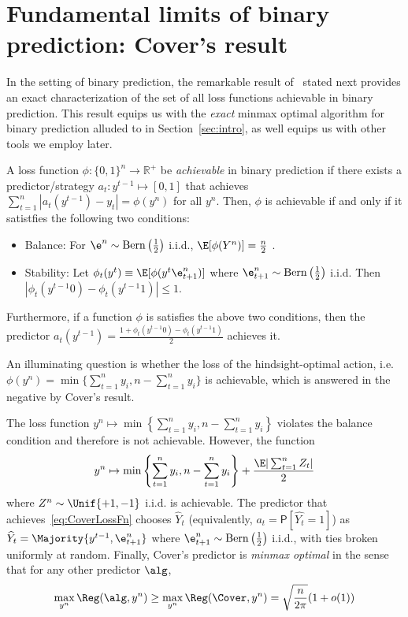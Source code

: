\section{Fundamental limits of binary prediction: Cover's result} \label{appendix:Cover}

In the setting of binary prediction, the remarkable result of~\cite{Cover1966} stated next provides an exact characterization of the set of all loss functions achievable in binary prediction. This result equips us with the \emph{exact} minmax optimal algorithm for binary prediction alluded to in Section~\ref{sec:intro}, as well equips us with other tools we employ later. 
\begin{theorem}  \label{thm:CoverAchievableFn}
A loss function $\phi : \{0,1\}^n \to \mathbb{R}^+$ be \emph{achievable} in binary prediction if there exists a predictor/strategy $a_t: y^{t-1} \mapsto [0,1]$ that achieves $\sum_{t=1}^n |a_t(y^{t-1})-y_t| = \phi(y^n)$ 
for all $y^n$. Then, $\phi$ is achievable if and only if it satistfies the following two conditions:
\begin{itemize}
    \item Balance: For $\e^n \sim \mathrm{Bern}\left(\frac{1}{2}\right)$ i.i.d.,  $\E[\phi(Y^n)] = \frac{n}{2}$ . 
    \item Stability: Let $\phi_t(y^t) \equiv \E[\phi(y^{t}\e_{t+1}^n)]$ where $\e_{t+1}^n \sim \mathrm{Bern}\left(\frac{1}{2}\right)$ i.i.d. Then $|\phi_t(y^{t-1}0)-\phi_t(y^{t-1}1)| \le 1$. 
    \end{itemize}
    Furthermore, if a function $\phi$ is satisfies the above two conditions, then the predictor $a_t(y^{t-1}) = \frac{1+\phi_t(y^{t-1}0)-\phi_t(y^{t-1}1)}{2}$ achieves it.
\end{theorem}

An illuminating question is whether the loss of the hindsight-optimal action, i.e. $\phi(y^n) = \min\{\sum_{t=1}^n y_i, n-\sum_{t=1}^n y_i\}$ is achievable, which is answered in the negative by Cover's result. 

\begin{corollary} \label{cor:BinPredOptReg}
    The loss function $y^n \mapsto \min\left\{\sum_{t=1}^n y_i, n-\sum_{t=1}^n y_i\right\}$ violates the balance condition and therefore is not achievable. However, the function 
    \begin{align}
    \label{eq:CoverLossFn}
    y^n \mapsto \min\left\{\sum_{t=1}^n y_i, n-\sum_{t=1}^n y_i\right\} + \frac{\E|\sum_{t=1}^n Z_t|}{2}
    \end{align}
    where $Z^n \sim \Unif\{+1,-1\}$ i.i.d. is achievable. The predictor that achieves~\cref{eq:CoverLossFn} chooses $\widehat{Y}_t$ (equivalently, $a_t = \mathsf{P}[\widehat{Y_t} = 1]$) as
        $\widehat{Y}_t = \Majority\{y^{t-1},\e_{t+1}^n\}$
    where $\e_{t+1}^n \sim \mathrm{Bern}\left(\frac{1}{2}\right)$ i.i.d., with ties broken uniformly at random. Finally, Cover's predictor is \emph{minmax optimal} in the sense that for any other predictor $\alg$, 
    \[
    \max_{y^n} \Reg(\alg, y^n) \ge \max_{y^n} \Reg(\Cover, y^n) = \sqrt{\frac{n}{2\pi}}(1+o(1))
    \]
\end{corollary}